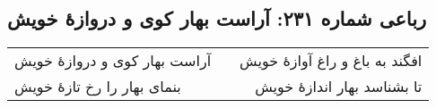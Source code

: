 \begin{center}
\section*{رباعی شماره ۲۳۱: آراست بهار کوی و دروازهٔ خویش}
\label{sec:sh231}
\begin{longtable}{l p{0.5cm} r}
آراست بهار کوی و دروازهٔ خویش
&&
افگند به باغ و راغ آوازهٔ خویش
\\
بنمای بهار را رخ تازهٔ خویش
&&
تا بشناسد بهار اندازهٔ خویش
\\
\end{longtable}
\end{center}
